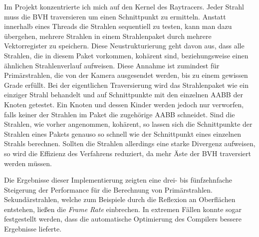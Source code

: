 \documentclass[crop=false]{standalone}
\begin{document}
      Im Projekt konzentrierte ich mich auf den Kernel des Raytracers.
      Jeder Strahl muss die BVH traversieren um einen Schnittpunkt zu ermitteln.
      Anstatt innerhalb eines Threads die Strahlen sequentiell zu testen, kann man dazu übergehen, mehrere Strahlen in einem Strahlenpaket durch mehrere Vektorregister zu speichern.
      Diese Neustrukturierung geht davon aus, dass alle Strahlen, die in diesem Paket vorkommen, kohärent sind, beziehungsweise einen ähnlichen Strahlenverlauf aufweisen.
      Diese Annahme ist zumindest für Primärstrahlen, die von der Kamera ausgesendet werden, bis zu einem gewissen Grade erfüllt.
      Bei der eigentlichen Traversierung wird das Strahlenpaket wie ein einziger Strahl behandelt und auf Schnittpunkte mit den einzelnen AABB der Knoten getestet.
      Ein Knoten und dessen Kinder werden jedoch nur verworfen, falls keiner der Strahlen im Paket die zugehörige AABB schneidet.
      Sind die Strahlen, wie vorher angenommen, kohärent, so lassen sich die Schnittpunkte der Strahlen eines Pakets genauso so schnell wie der Schnittpunkt eines einzelnen Strahls berechnen.
      Sollten die Strahlen allerdings eine starke Divergenz aufweisen, so wird die Effizienz des Verfahrens reduziert, da mehr Äste der BVH traversiert werden müssen.

      Die Ergebnisse dieser Implementierung zeigten eine drei- bis fünfzehnfache Steigerung der Performance für die Berechnung von Primärstrahlen.
      Sekundärstrahlen, welche zum Beispiele durch die Reflexion an Oberflächen entstehen, ließen die \textit{Frame Rate} einbrechen.
      In extremen Fällen konnte sogar festgestellt werden, dass die automatische Optimierung des Compilers bessere Ergebnisse lieferte.
\end{document}
